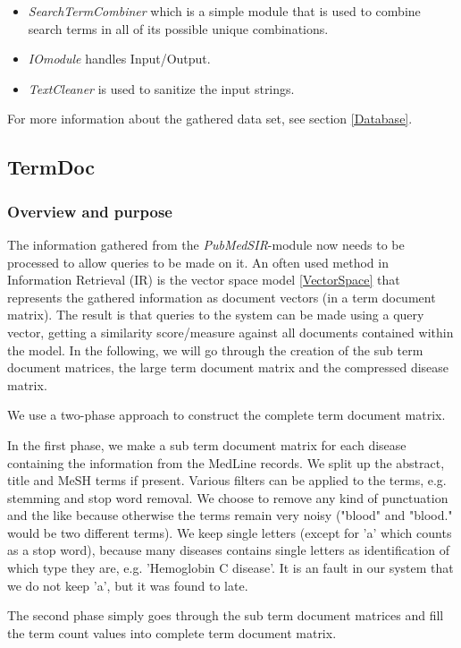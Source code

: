 \begin{itemize}
\item \textit{SearchTermCombiner} which is a simple module that is
  used to combine search terms in all of its possible unique
  combinations.
\item \textit{IOmodule} handles Input/Output.
\item \textit{TextCleaner} is used to sanitize the input strings.
\end{itemize}

For more information about the gathered data set, see section \ref{Database}.

\subsection{TermDoc\label{TermDoc}}

\subsubsection{Overview and purpose}
The information gathered from the \textit{PubMedSIR}-module now needs
to be processed to allow queries to be made on it. An often used
method in Information Retrieval (IR) is the vector space model
\ref{VectorSpace} that represents the gathered information as document
vectors (in a term document matrix). The result is that queries to the
system can be made using a query vector, getting a similarity
score/measure against all documents contained within the model. In the
following, we will go through the creation of the sub term document
matrices, the large term document matrix and the compressed disease
matrix.

We use a two-phase approach to construct the complete term document
matrix.

In the first phase, we make a sub term document matrix for each
disease containing the information from the MedLine records. We split
up the abstract, title and MeSH terms if present. Various filters can
be applied to the terms, e.g. stemming and stop word removal. We
choose to remove any kind of punctuation and the like because
otherwise the terms remain very noisy ("blood" and "blood." would be
two different terms). We keep single letters (except for 'a' which
counts as a stop word), because many diseases contains single letters
as identification of which type they are, e.g. 'Hemoglobin C
disease'. It is an fault in our system that we do not keep 'a', but it
was found to late.

The second phase simply goes through the sub term document matrices
and fill the term count values into complete term document matrix.

